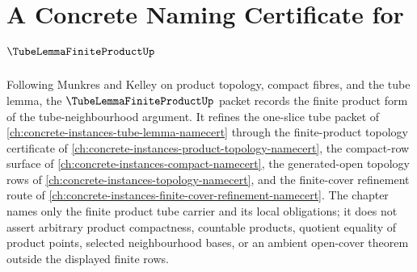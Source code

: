 \chapter{A Concrete Naming Certificate for $\TubeLemmaFiniteProductUp$}
\label{ch:concrete-instances-tube-lemma-finite-product-namecert}

Following Munkres and Kelley on product topology, compact fibres, and the tube lemma, the $\TubeLemmaFiniteProductUp$ packet records the finite product form of the tube-neighbourhood argument. It refines the one-slice tube packet of \autoref{ch:concrete-instances-tube-lemma-namecert} through the finite-product topology certificate of \autoref{ch:concrete-instances-product-topology-namecert}, the compact-row surface of \autoref{ch:concrete-instances-compact-namecert}, the generated-open topology rows of \autoref{ch:concrete-instances-topology-namecert}, and the finite-cover refinement route of \autoref{ch:concrete-instances-finite-cover-refinement-namecert}. The chapter names only the finite product tube carrier and its local obligations; it does not assert arbitrary product compactness, countable products, quotient equality of product points, selected neighbourhood bases, or an ambient open-cover theorem outside the displayed finite rows.

